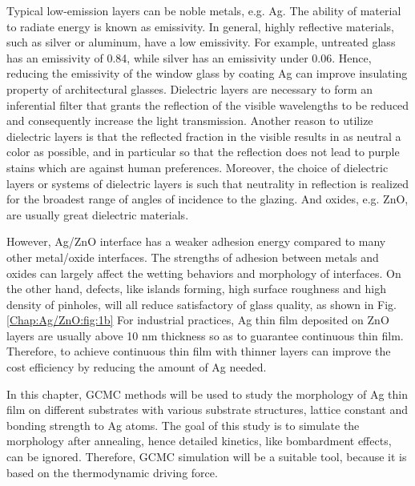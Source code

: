 Typical low-emission layers can be noble metals, e.g. Ag. The ability of material to radiate energy is known as emissivity. In general, highly reflective materials, such as silver or aluminum, have a low emissivity. For example, untreated glass has an emissivity of 0.84, while silver has an emissivity under 0.06. \cite{salisbury1992emissivity} Hence, reducing the emissivity of the window glass by coating Ag can improve insulating property of architectural glasses. Dielectric layers are necessary to form an inferential filter that grants the reflection of the visible wavelengths to be reduced and consequently increase the light transmission. Another reason to utilize dielectric layers is that the reflected fraction in the visible results in as neutral a color as possible, and in particular so that the reflection does not lead to purple stains which are against human preferences. Moreover, the choice of dielectric layers or systems of dielectric layers is such that neutrality in reflection is realized for the broadest range of angles of incidence to the glazing. And oxides, e.g. ZnO, are usually great dielectric materials.

However, Ag/ZnO interface has a weaker adhesion energy compared to many other metal/oxide interfaces. The strengths of adhesion between metals and oxides can largely affect the wetting behaviors and morphology of interfaces. On the other hand, defects, like islands forming, high surface roughness and high density of pinholes, will all reduce satisfactory of glass quality, as shown in Fig. \ref{Chap:Ag/ZnO:fig:1b} For industrial practices, Ag thin film deposited on ZnO layers are usually above 10 nm thickness so as to guarantee continuous thin film. Therefore, to achieve continuous thin film with thinner layers can improve the cost efficiency by reducing the amount of Ag needed.

In this chapter, \ac{GCMC} methods will be used to study the morphology of Ag thin film on different substrates with various substrate structures, lattice constant and bonding strength to Ag atoms. The goal of this study is to simulate the morphology after annealing, hence detailed kinetics, like bombardment effects, can be ignored. Therefore, \ac{GCMC} simulation will be a suitable tool, because it is based on the thermodynamic driving force.
